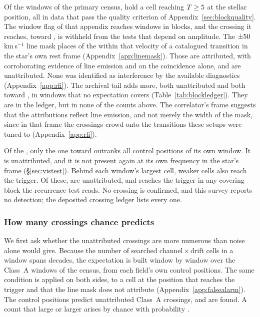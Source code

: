 Of the \NWindows{} windows of the primary census, \CsNCross{} hold a cell
reaching $T\geq5$ at the stellar position, all in data that pass
the quality criterion of Appendix~\ref{sec:blockquality}. The window flag of
that appendix reaches \DqNWin{} windows in \BkFlagNBlock{} blocks, and the
\BkFlagNCrossOther{} crossing it reaches, toward \BkFlagOtherStar, is
withheld from the tests that depend on amplitude. The
$\pm50$\,km\,s$^{-1}$ line mask places \MkNCoinc{} of the
\CsNCrossQp{} within that velocity of a catalogued transition in the star's
own rest frame (Appendix~\ref{app:linemask}). Those \CsNAttrQp{} are
attributed, \LnAttrSupp{} with corroborating evidence of line emission and
\LnAttrCoinc{} on the coincidence alone, and \CsNUnattrQp{} are
unattributed. None was identified as interference by the available
diagnostics (Appendix~\ref{app:rfi}). The archival tail adds
\CeNTailCrossWord{} more, both unattributed and both toward \CeTailStar, in
windows that no expectation covers (Table~\ref{tab:blockledger}). They are in
the ledger, but in none of the counts above. The correlator's frame
suggests that the attributions reflect line emission, and not merely the
width of the mask, since in that frame the crossings crowd onto the
transitions these setups were tuned to (Appendix~\ref{app:rfi}).

Of the \CsNCrossQp, only the one toward \EvAStar{} outranks all \NCtrl{}
control positions of its own window. It is unattributed, and it is not
present again at its own frequency in the star's frame
(\S\ref{sec:vistest}). Behind each
window's largest cell, \CkNSecondaryWord{} weaker cells also reach the
trigger. Of these, \CkNSecUnattrWord{} are unattributed, and \CkNRecurWord{} reaches the
trigger in any covering block the recurrence test reads. No crossing
is confirmed, and this survey reports no detection; the deposited
crossing ledger lists every one.

\subsubsection{How many crossings chance predicts}
\label{sec:trigunif}

We first ask whether the unattributed crossings are more numerous than
noise alone would give. Because the number of searched
channel\,$\times$\,drift cells in a window spans \TuCellsDecades{} decades,
the expectation is built window by window over the \CeNWin{} Class~A windows
of the census, from each field's own control positions. The same condition
is applied on both sides, to a cell at the position that reaches the trigger
and that the line mask does not attribute (Appendix~\ref{app:falsealarm}). The
control positions predict \CeExp{} unattributed Class~A crossings, and
\CeObs{} are found. A count that large or larger arises by chance with
probability \CeProbNull.

